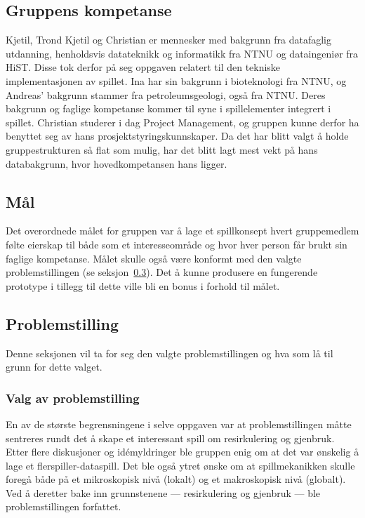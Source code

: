 \subsection{Gruppens kompetanse}

Kjetil, Trond Kjetil og Christian er mennesker med bakgrunn fra datafaglig utdanning, henholdsvis datateknikk og informatikk fra NTNU og dataingeniør fra HiST. Disse tok derfor på seg oppgaven relatert til den tekniske implementasjonen av spillet.
Ina har sin bakgrunn i bioteknologi fra NTNU, og Andreas' bakgrunn stammer fra petroleumsgeologi, også fra NTNU.
Deres bakgrunn og faglige kompetanse kommer til syne i spillelementer integrert i spillet.
Christian studerer i dag Project Management, og gruppen kunne derfor ha benyttet seg av hans prosjektstyringskunnskaper. Da det har blitt valgt å holde gruppestrukturen så flat som mulig, har det blitt lagt mest vekt på hans databakgrunn, hvor hovedkompetansen hans ligger.

\subsection{Mål}
Det overordnede målet for gruppen var å lage et spillkonsept hvert
gruppemedlem følte eierskap til både som et interesseområde og hvor hver person får brukt sin faglige kompetanse. Målet skulle også være konformt med den valgte
problemstillingen (se seksjon~\ref{sec:problemstilling}). Det å kunne produsere en fungerende prototype i tillegg til dette ville bli en bonus i forhold til målet.

\subsection{Problemstilling}
\label{sec:problemstilling}
Denne seksjonen vil ta for seg den valgte problemstillingen og hva som
lå til grunn for dette valget.
\subsubsection{Valg av problemstilling}
En av de største begrensningene i selve oppgaven var at
problemstillingen måtte sentreres rundt det å skape et interessant spill
om resirkulering og gjenbruk. Etter flere diskusjoner og idémyldringer ble gruppen
enig om at det var ønskelig å lage et flerspiller-dataspill.
Det ble også ytret ønske om at spillmekanikken skulle foregå både på et
mikroskopisk nivå (lokalt) og et makroskopisk nivå (globalt). Ved å
deretter bake inn grunnstenene — resirkulering og
gjenbruk — ble problemstillingen forfattet.
